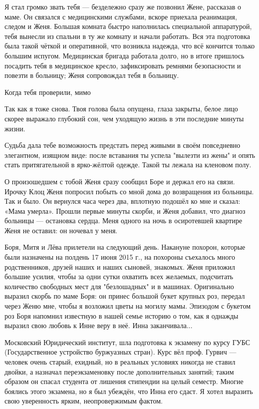 \label{289-1}
Я стал громко звать тебя — бездележно сразу же позвонил Жене, рассказав о маме. Он связался с медицинскими службами, вскоре приехала реанимация, следом и Женя. Большая комната быстро наполнилась специальной аппаратурой, тебя вынесли из спальни в ту же комнату и начали работать. Вся эта подготовка была такой чёткой и оперативной, что возникла надежда, что всё кончится только большим испугом. Медицинская бригада работала долго, но в итоге пришлось посадить тебя в медицинское кресло, зафиксировать ремнями безопасности и повезти в больницу; Женя сопровождал тебя в больницу.

Когда тебя проверили, мимо

Так как я тоже снова. Твоя голова была опущена, глаза закрыты, белое лицо скорее выражало глубокий сон, чем уходящую жизнь в эти последние минуты жизни.

\label{290-1}
Судьба дала тебе возможность предстать перед живыми в своём повседневно элегантном, изящном виде: после вставания ты успела "вылезти из жены" и опять стать притягательной в ярко-жёлтой одежде. Такой ты лежала на кленовом полу.

О произошедшем с тобой Женя сразу сообщил Боре и держал его на связи. Ирочку Клоц Женя попросил побыть со мной дома до возвращения из больницы. Так и было. Он вернулся часа через два, вплотную подошёл ко мне и сказал: «Мама умерла». Прошли первые минуты скорби, и Женя добавил, что диагноз больницы — остановка сердца. Меня одного на ночь в осиротевшей квартире Женя не оставил: он ночевал у меня.

\label{291-1}
Боря, Митя и Лёва прилетели на следующий день. Накануне похорон, которые были назначены на полдень 17 июня 2015 г., на похороны съехалось много родственников, друзей наших и наших сыновей, знакомых. Женя приложил большие усилия, чтобы за одни сутки охватить всех желаемых, подсчитать количество свободных мест для "безлошадных" и в машинах. Оригинально выразил скорбь по маме Боря: он принес большой букет крупных роз, передал через Женю мне, чтобы я возложил цветы на могилу мамы. Эпизодом с букетом роз Боря напомнил известную в нашей семье историю о том, как я однажды выразил свою любовь к Инне веру в неё. Инна заканчивала...

\label{292-1}
Московский Юридический институт, шла подготовка к экзамену по курсу ГУБС (Государственное устройство буржуазных стран). Курс вёл проф. Гурвич — человек очень старый, ехидный, но в реальных условиях никогда не ставил двойки, а назначал переэкзаменовку после дополнительных занятий; таким образом он спасал студента от лишения стипендии на целый семестр. Многие боялись этого экзамена, но я был убеждён, что Инна его сдаст. Я хотел выразить свою уверенность ярким, неопровержимым фактом.

